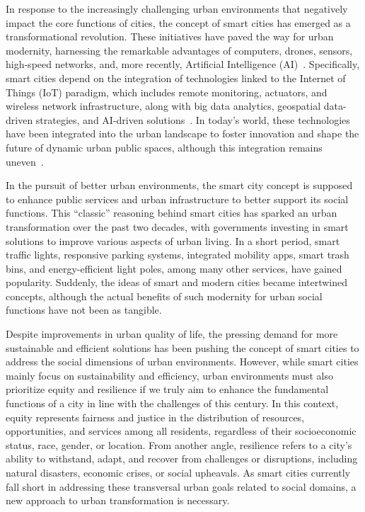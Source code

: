 \documentclass[smartcities,article,submit,pdftex,moreauthors]{Definitions/mdpi}
\begin{document}
In response to the increasingly challenging urban environments that negatively impact the core functions of cities, the concept of smart cities has emerged as a transformational revolution. These initiatives have paved the way for urban modernity, harnessing the remarkable advantages of computers, drones, sensors, high-speed networks, and, more recently, Artificial Intelligence (AI)~\cite{kirimtatFutureTrendsCurrent2020,singhDecadeReviewSmart2022,bittencourtSurveyAdaptiveSmart2024}. Specifically, smart cities depend on the integration of technologies linked to the Internet of Things (IoT) paradigm, which includes remote monitoring, actuators, and wireless network infrastructure, along with big data analytics, geospatial data-driven strategies, and AI-driven solutions~\cite{duSensableCitySurvey2019,costaAchievingSustainableSmart2024}. In today’s world, these technologies have been integrated into the urban landscape to foster innovation and shape the future of dynamic urban public spaces, although this integration remains uneven~\cite{zengSensorsInternetThings2024}.
 
In the pursuit of better urban environments, the smart city concept is supposed to enhance public services and urban infrastructure to better support its social functions. This ``classic'' reasoning behind smart cities has sparked an urban transformation over the past two decades, with governments investing in smart solutions to improve various aspects of urban living. In a short period, smart traffic lights, responsive parking systems, integrated mobility apps, smart trash bins, and energy-efficient light poles, among many other services, have gained popularity. Suddenly, the ideas of smart and modern cities became intertwined concepts, although the actual benefits of such modernity for urban social functions have not been as tangible.

Despite improvements in urban quality of life, the pressing demand for more sustainable and efficient solutions has been pushing the concept of smart cities to address the social dimensions of urban environments. However, while smart cities mainly focus on sustainability and efficiency, urban environments must also prioritize equity and resilience if we truly aim to enhance the fundamental functions of a city in line with the challenges of this century. In this context, equity represents fairness and justice in the distribution of resources, opportunities, and services among all residents, regardless of their socioeconomic status, race, gender, or location. From another angle, resilience refers to a city's ability to withstand, adapt, and recover from challenges or disruptions, including natural disasters, economic crises, or social upheavals. As smart cities currently fall short in addressing these transversal urban goals related to social domains, a new approach to urban transformation is necessary.
\end{document}
